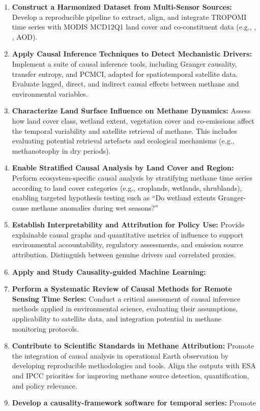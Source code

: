\begin{enumerate}
    \item \textbf{Construct a Harmonized Dataset from Multi-Sensor Sources:} Develop a reproducible pipeline to extract, align, and integrate TROPOMI  time series with MODIS MCD12Q1 land cover and co-constituent data (e.g., , , AOD).

    \item \textbf{Apply Causal Inference Techniques to Detect Mechanistic Drivers:} Implement a suite of causal inference tools, including Granger causality, transfer entropy, and PCMCI, adapted for spatiotemporal satellite data. Evaluate lagged, direct, and indirect causal effects between methane and environmental variables.

    \item \textbf{Characterize Land Surface Influence on Methane Dynamics:} Assess how land cover class, wetland extent, vegetation cover and co-emissions affect the temporal variability and satellite retrieval of methane. This includes evaluating potential retrieval artefacts and ecological mechanisms (e.g., methanotrophy in dry periods).
    
    \item \textbf{Enable Stratified Causal Analysis by Land Cover and Region:} Perform ecosystem-specific causal analysis by stratifying methane time series according to land cover categories (e.g., croplands, wetlands, shrublands), enabling targeted hypothesis testing such as “Do wetland extents Granger-cause methane anomalies during wet seasons?”

    \item \textbf{Establish Interpretability and Attribution for Policy Use:} Provide explainable causal graphs and quantitative metrics of influence to support environmental accountability, regulatory assessments, and emission source attribution. Distinguish between genuine drivers and correlated proxies.

    \item \textbf{Apply and Study Causality-guided Machine Learning:} 

    \item \textbf{Perform a Systematic Review of Causal Methods for Remote Sensing Time Series:} Conduct a critical assessment of causal inference methods applied in environmental science, evaluating their assumptions, applicability to satellite data, and integration potential in methane monitoring protocols.

    \item \textbf{Contribute to Scientific Standards in Methane Attribution:} Promote the integration of causal analysis in operational Earth observation by developing reproducible methodologies and tools. Align the outputs with ESA and IPCC priorities for improving methane source detection, quantification, and policy relevance.

    \item \textbf{Develop a causality-framework software for temporal series:} Promote 

\end{enumerate}

